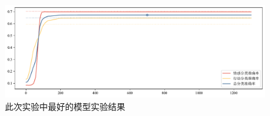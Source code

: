 \begin{figure}[htb]
	\centering
	\includegraphics[width=0.75\linewidth]{images/TheBest.pdf}
	\caption{此次实验中最好的模型实验结果}
	\label{fig:theBest}
\end{figure}